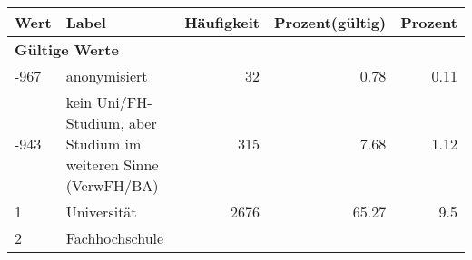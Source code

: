      \begin{longtable}{lXrrr}
     \toprule
     \textbf{Wert} & \textbf{Label} & \textbf{Häufigkeit} & \textbf{Prozent(gültig)} & \textbf{Prozent} \\
     \endhead
     \midrule
     \multicolumn{5}{l}{\textbf{Gültige Werte}}\\

     -967 &
     \multicolumn{1}{X}{ anonymisiert   } &


       \num{32} &
       \num[round-mode=places,round-precision=2]{0.78} &
         \num[round-mode=places,round-precision=2]{0.11} \\

     -943 &
     \multicolumn{1}{X}{ kein Uni/FH-Studium, aber Studium im weiteren Sinne (VerwFH/BA)   } &


       \num{315} &
       \num[round-mode=places,round-precision=2]{7.68} &
         \num[round-mode=places,round-precision=2]{1.12} \\

     1 &
     \multicolumn{1}{X}{ Universität   } &


       \num{2676} &
       \num[round-mode=places,round-precision=2]{65.27} &
         \num[round-mode=places,round-precision=2]{9.5} \\

     2 &
     \multicolumn{1}{X}{ Fachhochschule   } &



\end{longtable}
